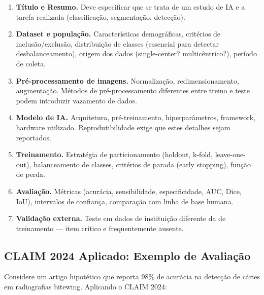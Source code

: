 \begin{enumerate}
    \item \textbf{Título e Resumo.} Deve especificar que se trata de um estudo de IA e a tarefa realizada (classificação, segmentação, detecção).
    \item \textbf{Dataset e população.} Características demográficas, critérios de inclusão/exclusão, distribuição de classes (essencial para detectar desbalanceamento), origem dos dados (single-center? multicêntrico?), período de coleta.
    \item \textbf{Pré-processamento de imagens.} Normalização, redimensionamento, augmentação. Métodos de pré-processamento diferentes entre treino e teste podem introduzir vazamento de dados.
    \item \textbf{Modelo de IA.} Arquitetura, pré-treinamento, hiperparâmetros, framework, hardware utilizado. Reprodutibilidade exige que estes detalhes sejam reportados.
    \item \textbf{Treinamento.} Estratégia de particionamento (holdout, k-fold, leave-one-out), balanceamento de classes, critérios de parada (early stopping), função de perda.
    \item \textbf{Avaliação.} Métricas (acurácia, sensibilidade, especificidade, AUC, Dice, IoU), intervalos de confiança, comparação com linha de base humana.
    \item \textbf{Validação externa.} Teste em dados de instituição diferente da de treinamento — item crítico e frequentemente ausente.
\end{enumerate}

\subsection{CLAIM 2024 Aplicado: Exemplo de Avaliação}

Considere um artigo hipotético que reporta 98\% de acurácia na detecção de cáries em radiografias bitewing. Aplicando o CLAIM 2024:

